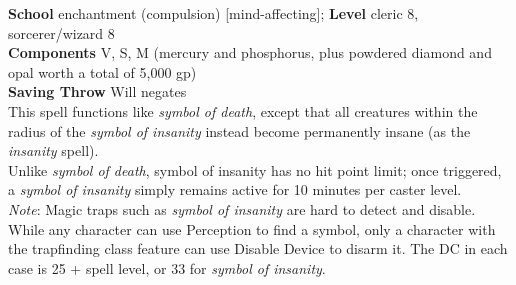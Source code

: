 \textbf{School} enchantment (compulsion) [mind-affecting]; \textbf{Level} cleric 8, sorcerer/wizard 8\\
\textbf{Components} V, S, M (mercury and phosphorus, plus powdered diamond and opal worth a total of 5,000 gp)\\
\textbf{Saving Throw }Will negates\\
This spell functions like \textit{symbol of death}, except that all creatures within the radius of the \textit{symbol of insanity }instead become permanently insane (as the \textit{insanity }spell).\\
Unlike \textit{symbol of death}, symbol of insanity has no hit point limit; once triggered, a \textit{symbol of insanity }simply remains active for 10 minutes per caster level.\\
\textit{Note}: Magic traps such as \textit{symbol of insanity }are hard to detect and disable. While any character can use Perception to find a symbol, only a character with the trapfinding class feature can use Disable Device to disarm it. The DC in each case is 25 + spell level, or 33 for \textit{symbol of insanity}.\\
